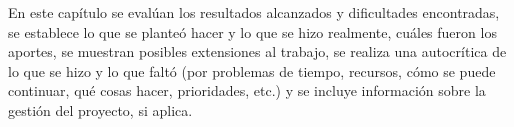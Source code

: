 En este capítulo se evalúan los resultados alcanzados y
dificultades encontradas, se establece lo que se planteó hacer y lo que se hizo
realmente, cuáles fueron los aportes, se muestran posibles extensiones al trabajo, se
realiza una autocrítica de lo que se hizo y lo que faltó (por problemas de tiempo,
recursos, cómo se puede continuar, qué cosas hacer, prioridades, etc.) y se incluye
información sobre la gestión del proyecto, si aplica.
